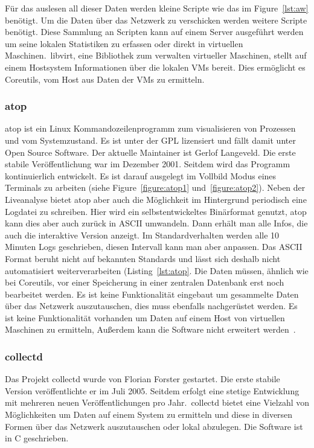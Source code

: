 Für das auslesen all dieser Daten werden kleine Scripte wie das im
Figure~\ref{lst:aw} benötigt. Um die Daten über das Netzwerk zu verschicken
werden weitere Scripte benötigt. Diese Sammlung an Scripten kann auf einem
Server ausgeführt werden um seine lokalen Statistiken zu erfassen oder direkt
in virtuellen Maschinen.\ libvirt, eine Bibliothek zum verwalten virtueller
Maschinen, stellt auf einem Hostsystem Informationen über die lokalen VMs
bereit. Dies ermöglicht es Coreutils, vom Host aus Daten der VMs zu ermitteln.
\tm%

\subsubsection{atop}
atop ist ein Linux Kommandozeilenprogramm zum visualisieren von Prozessen und
vom Systemzustand. Es ist unter der GPL lizensiert und fällt damit unter
Open Source Software. Der aktuelle Maintainer ist Gerlof Langeveld. Die erste
stabile Veröffentlichung war im Dezember 2001. Seitdem wird das Programm
kontinuierlich entwickelt. Es ist darauf ausgelegt im Vollbild Modus eines
Terminals zu arbeiten (siehe Figure~\ref{figure:atop1} und~\ref{figure:atop2}).
Neben der Liveanalyse bietet atop aber auch die Möglichkeit im Hintergrund
periodisch eine Logdatei zu schreiben. Hier wird ein selbstentwickeltes
Binärformat genutzt, atop kann dies aber auch zurück in ASCII umwandeln. Dann
erhält man alle Infos, die auch die interaktive Version anzeigt. Im
Standardverhalten werden alle 10 Minuten Logs geschrieben, diesen Intervall
kann man aber anpassen. Das ASCII Format beruht nicht auf bekannten Standards
und lässt sich deshalb nicht automatisiert weiterverarbeiten
(Listing~\ref{lst:atop}. Die Daten müssen, ähnlich wie bei Coreutils, vor einer
Speicherung in einer zentralen Datenbank erst noch bearbeitet werden. Es ist
keine Funktionalität eingebaut um gesammelte Daten über das Netzwerk
auszutauschen, dies muss ebenfalls nachgerüstet werden. Es ist keine
Funktionalität vorhanden um Daten auf einem Host von virtuellen Maschinen zu
ermitteln, Außerdem kann die Software nicht erweitert werden~\cite{atop}.
\tm%

\subsubsection{collectd}
Das Projekt collectd wurde von Florian Forster gestartet. Die erste stabile
Version veröffentlichte er im Juli 2005. Seitdem erfolgt eine stetige
Entwicklung mit mehreren neuen Veröffentlichungen pro Jahr.\ collectd bietet
eine Vielzahl von Möglichkeiten um Daten auf einem System zu ermitteln und
diese in diversen Formen über das Netzwerk auszutauschen oder lokal abzulegen.
Die Software ist in C geschrieben.

